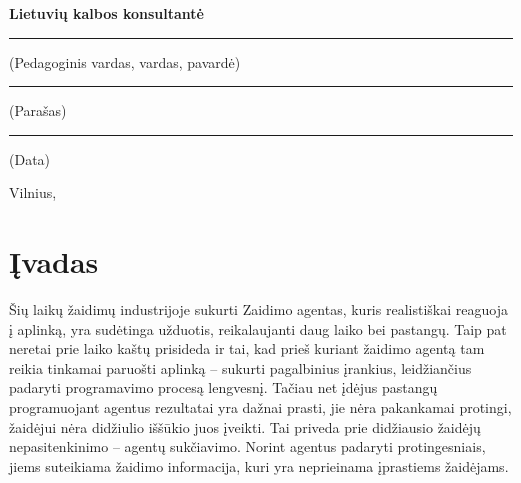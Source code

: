 \documentclass[a4paper, 12pt]{article}
\begin{document}
\begin{titlepage}
\vspace{\fill}

%
\begin{minipage}[t]{0.15\textwidth}
\bfseries Lietuvių kalbos konsultantė
\end{minipage}
%
\hspace{\fill}
%
\begin{minipage}[t]{0.4\textwidth}
\centering{}\hrule\medskip\scriptsize (Pedagoginis vardas, vardas, pavardė)
\end{minipage}
%
\hspace{\fill}
%
\begin{minipage}[t]{0.2\textwidth}
\centering\hrule\medskip\scriptsize (Parašas)
\end{minipage}
%
\hspace{\fill}
%
\begin{minipage}[t]{0.15\textwidth}
\centering\hrule\medskip\scriptsize (Data)
\end{minipage}


\vspace{\fill}
%

Vilnius, \the\year
\end{titlepage}





\tableofcontents
\newpage

\cleardoublepage
{}
{}
\listoffigures
\newpage




\section*{Įvadas}
{}
%
Šių laikų žaidimų industrijoje sukurti \gls{Zaidimo agentas}, kuris realistiškai reaguoja į aplinką, yra sudėtinga užduotis, reikalaujanti daug laiko bei pastangų. Taip pat neretai prie laiko kaštų prisideda ir tai, kad prieš kuriant žaidimo agentą tam reikia tinkamai paruošti aplinką – sukurti pagalbinius įrankius, leidžiančius padaryti programavimo procesą lengvesnį. Tačiau net įdėjus pastangų programuojant agentus rezultatai yra dažnai prasti, jie nėra pakankamai protingi, žaidėjui nėra didžiulio iššūkio juos įveikti. Tai priveda prie didžiausio žaidėjų nepasitenkinimo – agentų sukčiavimo. Norint agentus padaryti protingesniais, jiems suteikiama žaidimo informacija, kuri yra neprieinama įprastiems žaidėjams. 
\end{document}
